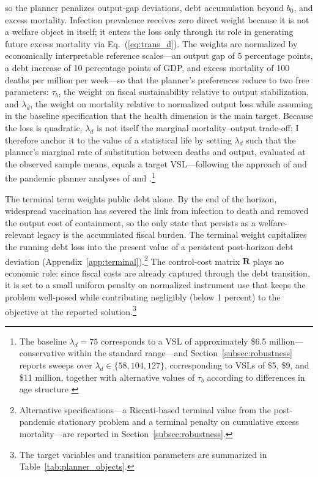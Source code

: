 \documentclass[12pt, a4paper]{article}
\begin{document}
so the planner penalizes output-gap deviations, debt accumulation beyond \(b_0\), and
excess mortality. Infection prevalence receives zero direct weight because it is not a
welfare object in itself; it enters the loss only through its role in generating future
excess mortality via Eq.~(\ref{eq:trans_d}). The weights are normalized by economically
interpretable reference scales---an output gap of 5 percentage points, a debt increase of
10 percentage points of GDP, and excess mortality of 100 deaths per million per week---so
that the planner's preferences reduce to two free parameters: \(\tau_b\), the weight on
fiscal sustainability relative to output stabilization, and \(\lambda_d\), the weight on
mortality relative to normalized output loss while assuming in the baseline specification that the health dimension is the main target. Because the loss is quadratic,
\(\lambda_d\) is not itself the marginal mortality--output trade-off; I therefore anchor it to the value of a statistical life by setting \(\lambda_d\) such that the planner's marginal rate of substitution between deaths and output, evaluated at the observed sample means, equals a target VSL---following the approach of \citet{hall2020trading} and the pandemic planner analyses of \citet{alvarez2021simple} and \citet{acemoglu2021}.\footnote{The baseline \(\lambda_d = 75\) corresponds to a VSL of approximately \$6.5 million---conservative within the standard range---and Section~\ref{subsec:robustness} reports sweeps over \(\lambda_d \in \{58, 104, 127\}\), corresponding to VSLs of \$5, \$9, and \$11 million, together with alternative values of
\(\tau_b\) according to differences in age structure \citep{greenstone2020social,robinson2021benefits} }

The terminal term weights public debt alone. By the end of the horizon, widespread
vaccination has severed the link from infection to death and removed the output cost of
containment, so the only state that persists as a welfare-relevant legacy is the
accumulated fiscal burden. The terminal weight capitalizes the running debt loss into the
present value of a persistent post-horizon debt deviation
(Appendix~\ref{app:terminal}).\footnote{Alternative specifications---a Riccati-based
terminal value from the post-pandemic stationary problem and a terminal penalty on
cumulative excess mortality---are reported in Section~\ref{subsec:robustness}.} The
control-cost matrix \(\bm{R}\) plays no economic role: since fiscal costs are already
captured through the debt transition, it is set to a small uniform penalty on normalized
instrument use that keeps the problem well-posed while contributing negligibly (below 1
percent) to the objective at the reported solution.\footnote{The target variables and
transition parameters are summarized in Table~\ref{tab:planner_objects}.}
\end{document}
